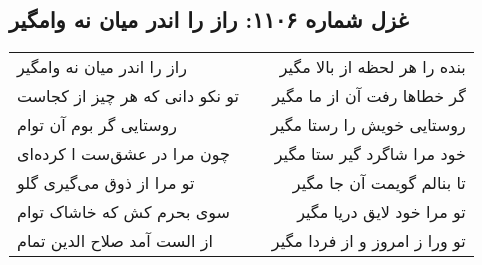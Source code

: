 \begin{center}
\section*{غزل شماره ۱۱۰۶: راز را اندر میان نه وامگیر}
\label{sec:1106}
\begin{longtable}{l p{0.5cm} r}
راز را اندر میان نه وامگیر
&&
بنده را هر لحظه از بالا مگیر
\\
تو نکو دانی که هر چیز از کجاست
&&
گر خطاها رفت آن از ما مگیر
\\
روستایی گر بوم آن توام
&&
روستایی خویش را رستا مگیر
\\
چون مرا در عشق‌ست ا کرده‌ای
&&
خود مرا شاگرد گیر ستا مگیر
\\
تو مرا از ذوق می‌گیری گلو
&&
تا بنالم گویمت آن جا مگیر
\\
سوی بحرم کش که خاشاک توام
&&
تو مرا خود لایق دریا مگیر
\\
از الست آمد صلاح الدین تمام
&&
تو ورا ز امروز و از فردا مگیر
\\
\end{longtable}
\end{center}
